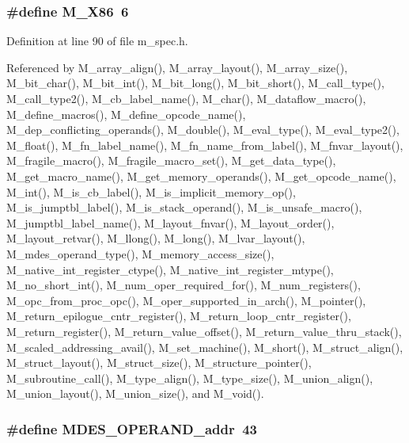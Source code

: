 \subsubsection{\setlength{\rightskip}{0pt plus 5cm}\#define M\_\-X86~6}\label{m__spec_8h_8e2201b78fdf7d6a7e3b9763aa4251f9}




Definition at line 90 of file m\_\-spec.h.

Referenced by M\_\-array\_\-align(), M\_\-array\_\-layout(), M\_\-array\_\-size(), M\_\-bit\_\-char(), M\_\-bit\_\-int(), M\_\-bit\_\-long(), M\_\-bit\_\-short(), M\_\-call\_\-type(), M\_\-call\_\-type2(), M\_\-cb\_\-label\_\-name(), M\_\-char(), M\_\-dataflow\_\-macro(), M\_\-define\_\-macros(), M\_\-define\_\-opcode\_\-name(), M\_\-dep\_\-conflicting\_\-operands(), M\_\-double(), M\_\-eval\_\-type(), M\_\-eval\_\-type2(), M\_\-float(), M\_\-fn\_\-label\_\-name(), M\_\-fn\_\-name\_\-from\_\-label(), M\_\-fnvar\_\-layout(), M\_\-fragile\_\-macro(), M\_\-fragile\_\-macro\_\-set(), M\_\-get\_\-data\_\-type(), M\_\-get\_\-macro\_\-name(), M\_\-get\_\-memory\_\-operands(), M\_\-get\_\-opcode\_\-name(), M\_\-int(), M\_\-is\_\-cb\_\-label(), M\_\-is\_\-implicit\_\-memory\_\-op(), M\_\-is\_\-jumptbl\_\-label(), M\_\-is\_\-stack\_\-operand(), M\_\-is\_\-unsafe\_\-macro(), M\_\-jumptbl\_\-label\_\-name(), M\_\-layout\_\-fnvar(), M\_\-layout\_\-order(), M\_\-layout\_\-retvar(), M\_\-llong(), M\_\-long(), M\_\-lvar\_\-layout(), M\_\-mdes\_\-operand\_\-type(), M\_\-memory\_\-access\_\-size(), M\_\-native\_\-int\_\-register\_\-ctype(), M\_\-native\_\-int\_\-register\_\-mtype(), M\_\-no\_\-short\_\-int(), M\_\-num\_\-oper\_\-required\_\-for(), M\_\-num\_\-registers(), M\_\-opc\_\-from\_\-proc\_\-opc(), M\_\-oper\_\-supported\_\-in\_\-arch(), M\_\-pointer(), M\_\-return\_\-epilogue\_\-cntr\_\-register(), M\_\-return\_\-loop\_\-cntr\_\-register(), M\_\-return\_\-register(), M\_\-return\_\-value\_\-offset(), M\_\-return\_\-value\_\-thru\_\-stack(), M\_\-scaled\_\-addressing\_\-avail(), M\_\-set\_\-machine(), M\_\-short(), M\_\-struct\_\-align(), M\_\-struct\_\-layout(), M\_\-struct\_\-size(), M\_\-structure\_\-pointer(), M\_\-subroutine\_\-call(), M\_\-type\_\-align(), M\_\-type\_\-size(), M\_\-union\_\-align(), M\_\-union\_\-layout(), M\_\-union\_\-size(), and M\_\-void().
\subsubsection{\setlength{\rightskip}{0pt plus 5cm}\#define MDES\_\-OPERAND\_\-addr~43}\label{m__spec_8h_74b631a3152717aba3cff7dce4ebe059}




